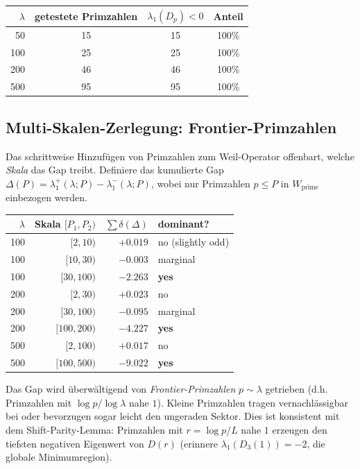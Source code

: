 \documentclass[12pt,a4paper]{article}
\theoremstyle{definition}
\theoremstyle{remark}
\begin{document}
\begin{center}
\renewcommand{\arraystretch}{1.15}
\begin{tabular}{r|c|c|c}
$\lambda$ & getestete Primzahlen & $\lambda_1(D_p) < 0$ & Anteil \\\hline
50 & 15 & 15 & 100\% \\
100 & 25 & 25 & 100\% \\
200 & 46 & 46 & 100\% \\
500 & 95 & 95 & 100\%
\end{tabular}
\end{center}

\subsection{Multi-Skalen-Zerlegung: Frontier-Primzahlen}
\label{sec:frontier}

Das schrittweise Hinzufügen von Primzahlen zum Weil-Operator offenbart, welche \emph{Skala} das Gap treibt. Definiere das kumulierte Gap $\Delta(P) = \lambda_1^+(\lambda; P) - \lambda_1^-(\lambda; P)$, wobei nur Primzahlen $p \leq P$ in $W_{\mathrm{prime}}$ einbezogen werden.

\begin{center}
\renewcommand{\arraystretch}{1.15}
\begin{tabular}{r|r|r|l}
$\lambda$ & Skala $[P_1, P_2)$ & $\sum \delta(\Delta)$ & dominant? \\\hline
100 & $[2, 10)$ & $+0.019$ & no (slightly odd) \\
100 & $[10, 30)$ & $-0.003$ & marginal \\
100 & $[30, 100)$ & $-2.263$ & \textbf{yes} \\[3pt]
200 & $[2, 30)$ & $+0.023$ & no \\
200 & $[30, 100)$ & $-0.095$ & marginal \\
200 & $[100, 200)$ & $-4.227$ & \textbf{yes} \\[3pt]
500 & $[2, 100)$ & $+0.017$ & no \\
500 & $[100, 500)$ & $-9.022$ & \textbf{yes}
\end{tabular}
\end{center}

Das Gap wird überwältigend von \emph{Frontier-Primzahlen} $p \sim \lambda$ getrieben (d.h. Primzahlen mit $\log p / \log\lambda$ nahe $1$). Kleine Primzahlen tragen vernachlässigbar bei oder bevorzugen sogar leicht den ungeraden Sektor. Dies ist konsistent mit dem Shift-Parity-Lemma: Primzahlen mit $r = \log p / L$ nahe $1$ erzeugen den tiefsten negativen Eigenwert von $D(r)$ (erinnere $\lambda_1(D_3(1)) = -2$, die globale Minimumregion).
\end{document}
